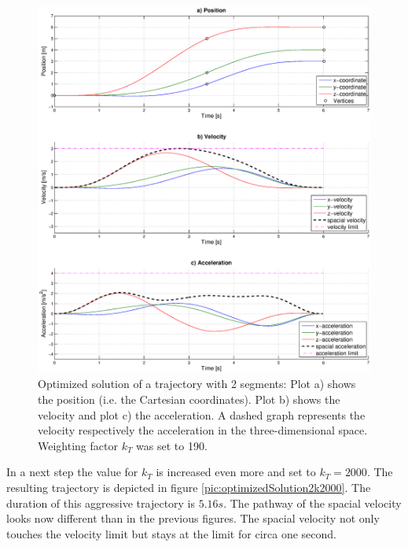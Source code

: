 \begin{figure}[H]
   \centering
   \includegraphics[trim = 35mm 20mm 30mm 15mm,clip,width=1\textwidth]{pics/2SegOpti6s01k190.eps}
   \caption{Optimized solution of a trajectory with 2 segments: Plot a) shows the position (i.e. the Cartesian coordinates). Plot b) shows the velocity and plot c) the acceleration. A dashed graph represents the velocity respectively the acceleration in the three-dimensional space. Weighting factor $k_T$ was set to 190.}
   \label{pic:optimizedSolution2k190}
\end{figure}


In a next step the value for $k_T$ is increased even more and set to $k_T = 2000$. The resulting trajectory is depicted in figure \ref{pic:optimizedSolution2k2000}. The duration of this aggressive trajectory is $5.16s$. The pathway of the spacial velocity looks now different than in the previous figures. The spacial velocity not only touches the velocity limit but stays at the limit for circa one second.

